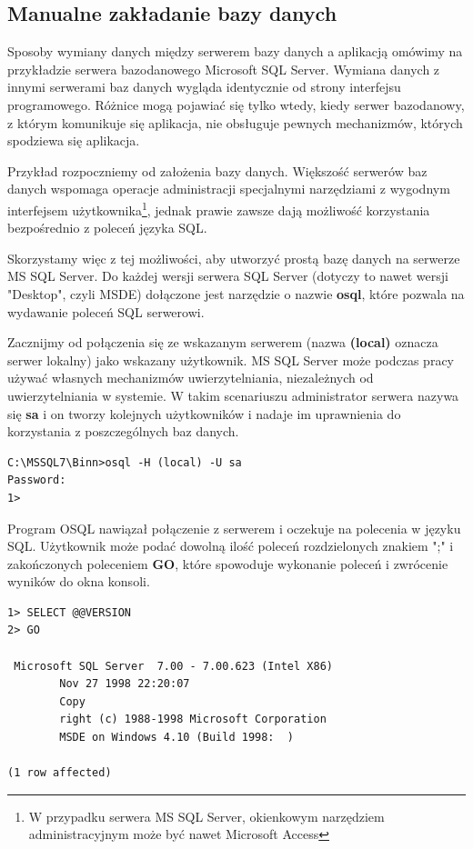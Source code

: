 \subsection{Manualne zakładanie bazy danych}

Sposoby wymiany danych między serwerem bazy danych a aplikacją omówimy na przykładzie
serwera bazodanowego Microsoft SQL Server. Wymiana danych z innymi serwerami baz danych
wygląda identycznie od strony interfejsu programowego. Różnice mogą pojawiać się tylko
wtedy, kiedy serwer bazodanowy, z którym komunikuje się aplikacja, nie obsługuje
pewnych mechanizmów, których spodziewa się aplikacja. 

Przykład rozpoczniemy od założenia bazy danych. Większość serwerów baz danych wspomaga operacje administracji 
specjalnymi narzędziami z wygodnym interfejsem użytkownika\footnote{W przypadku serwera MS SQL Server, okienkowym
narzędziem administracyjnym może być nawet Microsoft Access}, jednak prawie zawsze dają możliwość korzystania
bezpośrednio z poleceń języka SQL. 

Skorzystamy więc z tej możliwości, aby utworzyć prostą bazę danych na serwerze MS SQL Server. Do każdej wersji
serwera SQL Server (dotyczy to nawet wersji "Desktop", czyli MSDE) dołączone jest narzędzie o nazwie {\bf osql}, które
pozwala na wydawanie poleceń SQL serwerowi.

Zacznijmy od połączenia się ze wskazanym serwerem (nazwa {\bf (local)} oznacza serwer lokalny) jako wskazany
użytkownik. MS SQL Server może podczas pracy używać własnych mechanizmów uwierzytelniania, niezależnych
od uwierzytelniania w systemie. W takim scenariuszu administrator serwera nazywa się {\bf sa} i on tworzy
kolejnych użytkowników i nadaje im uprawnienia do korzystania z poszczególnych baz danych. 

\begin{scriptsize}
\begin{verbatim}
C:\MSSQL7\Binn>osql -H (local) -U sa
Password:
1>
\end{verbatim}
\end{scriptsize}

Program OSQL nawiązał połączenie z serwerem i oczekuje na polecenia w języku SQL. Użytkownik może
podać dowolną ilość poleceń rozdzielonych znakiem ";" i zakończonych poleceniem {\bf GO}, które
spowoduje wykonanie poleceń i zwrócenie wyników do okna konsoli.

\begin{scriptsize}
\begin{verbatim}
1> SELECT @@VERSION
2> GO

 Microsoft SQL Server  7.00 - 7.00.623 (Intel X86)
        Nov 27 1998 22:20:07
        Copy
        right (c) 1988-1998 Microsoft Corporation
        MSDE on Windows 4.10 (Build 1998:  )

(1 row affected)
\end{verbatim}
\end{scriptsize}

